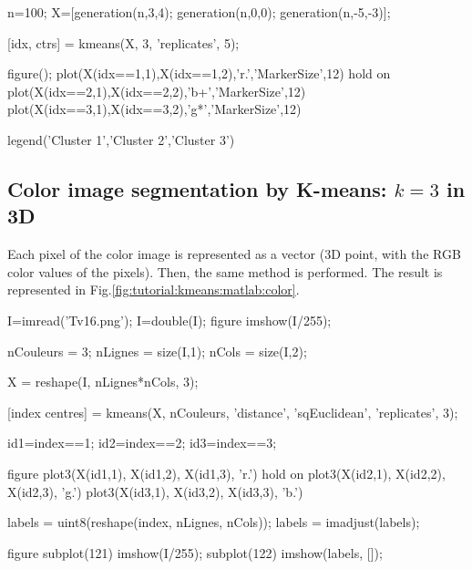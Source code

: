 \begin{matlab}
n=100;
X=[generation(n,3,4); generation(n,0,0); generation(n,-5,-3)];

[idx, ctrs] = kmeans(X, 3, 'replicates', 5);

figure();
plot(X(idx==1,1),X(idx==1,2),'r.','MarkerSize',12)
hold on
plot(X(idx==2,1),X(idx==2,2),'b+','MarkerSize',12)
plot(X(idx==3,1),X(idx==3,2),'g*','MarkerSize',12)

legend('Cluster 1','Cluster 2','Cluster 3')
\end{matlab}

\subsection{Color image segmentation by K-means: $k=3$ in 3D}
Each pixel of the color image is represented as a vector (3D point, with the RGB color values of the pixels). Then, the same method is performed. The result is represented in Fig.\ref{fig:tutorial:kmeans:matlab:color}.

\begin{matlab}
I=imread('Tv16.png');
I=double(I);
figure
imshow(I/255);

nCouleurs = 3; %
nLignes = size(I,1);
nCols   = size(I,2);

X = reshape(I, nLignes*nCols, 3);

[index centres] = kmeans(X, nCouleurs, 'distance', 'sqEuclidean', 'replicates', 3);

id1=index==1;
id2=index==2;
id3=index==3;

figure
plot3(X(id1,1), X(id1,2), X(id1,3), 'r.')
hold on
plot3(X(id2,1), X(id2,2), X(id2,3), 'g.')
plot3(X(id3,1), X(id3,2), X(id3,3), 'b.')

labels = uint8(reshape(index, nLignes, nCols));
labels = imadjust(labels);

figure
subplot(121)
imshow(I/255);
subplot(122)
imshow(labels, []);
\end{matlab}

